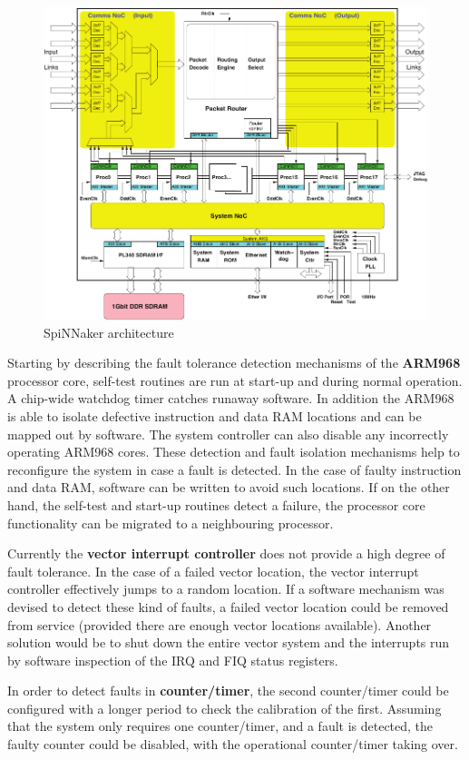 \documentclass[a4paper, 11pt]{article}
\newcounter{subsubsubsection}[subsubsection]
\begin{document}
\begin{figure}[t]
	\centering
	\includegraphics[width=0.7\linewidth]{images/spinnaker_architecture.pdf}
	\caption{SpiNNaker architecture}	
	\label{fig:spin_arch}
\end{figure}

Starting by describing the fault tolerance detection mechanisms of the \textbf{ARM968} processor core, self-test routines are run at start-up and during normal operation. A chip-wide watchdog timer catches runaway software. In addition the ARM968 is able to isolate defective instruction and data RAM locations and can be mapped out by software. The system controller can also disable any incorrectly operating ARM968 cores. These detection and fault isolation mechanisms help to reconfigure the system in case a fault is detected. In the case of faulty instruction and data RAM, software can be written to avoid such locations. If on the other hand, the self-test and start-up routines detect a failure, the processor core functionality can be migrated to a neighbouring processor.

Currently the \textbf{vector interrupt controller} does not provide a high degree of fault tolerance. In the case of a failed vector location, the vector interrupt controller effectively jumps to a random location. If a software mechanism was devised to detect these kind of faults, a failed vector location could be removed from service (provided there are enough vector locations available). Another solution would be to shut down the entire vector system and the interrupts run by software inspection of the IRQ and FIQ status registers.

In order to detect faults in \textbf{counter/timer}, the second counter/timer could be configured with a longer period to check the calibration of the first. Assuming that the system only requires one counter/timer, and a fault is detected, the faulty counter could be disabled, with the operational counter/timer taking over.
\end{document}
